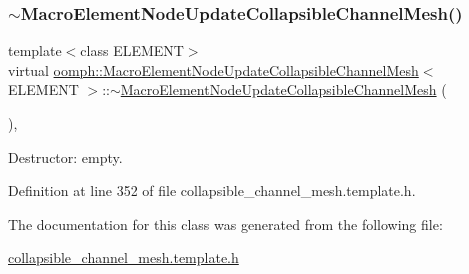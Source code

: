 \subsubsection{\texorpdfstring{$\sim$\+Macro\+Element\+Node\+Update\+Collapsible\+Channel\+Mesh()}{~MacroElementNodeUpdateCollapsibleChannelMesh()}}
{\footnotesize\ttfamily template$<$class E\+L\+E\+M\+E\+NT$>$ \\
virtual \hyperlink{classoomph_1_1MacroElementNodeUpdateCollapsibleChannelMesh}{oomph\+::\+Macro\+Element\+Node\+Update\+Collapsible\+Channel\+Mesh}$<$ E\+L\+E\+M\+E\+NT $>$\+::$\sim$\hyperlink{classoomph_1_1MacroElementNodeUpdateCollapsibleChannelMesh}{Macro\+Element\+Node\+Update\+Collapsible\+Channel\+Mesh} (\begin{DoxyParamCaption}{ }\end{DoxyParamCaption})\hspace{0.3cm}{\ttfamily [inline]}, {\ttfamily [virtual]}}



Destructor\+: empty. 



Definition at line 352 of file collapsible\+\_\+channel\+\_\+mesh.\+template.\+h.



The documentation for this class was generated from the following file\+:\begin{DoxyCompactItemize}
\item 
\hyperlink{collapsible__channel__mesh_8template_8h}{collapsible\+\_\+channel\+\_\+mesh.\+template.\+h}\end{DoxyCompactItemize}
